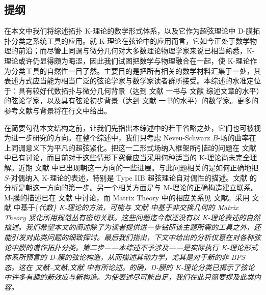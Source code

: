 \documentclass[11pt,a4paper]{ctexart}
\newcommand{\SrcRange}[2]{\marginpar{\raggedright\footnotesize 原文 p.#1}}
\begin{document}
\SrcRange{9}{9}
\subsection{提纲}\label{ux63d0ux7eb2}

在本文中我们将综述拓扑 K-理论的数学形式体系，以及它作为超弦理论中 D-膜拓扑分类之系统工具的应用。就 K-理论在弦论中的应用而言，它如今正处于数学物理的前沿；而尽管上同调与微分几何对大多数理论物理学家来说已相当熟悉，K-理论或许仍显得颇为晦涩，因此我们试图把数学与物理融合在一起，使 K-理论作为分类工具的自然性一目了然。主要目的是把所有相关的数学材料汇集于一处，其表述方式应当能为相当广泛的弦论学家与数学家读者群所接受。本综述的水准定位于：具有较好代数拓扑与微分几何背景（达到 文献 一书与 文献 综述文章的水平）的弦论学家，以及具有弦论初步背景（达到 文献 一书的水平）的数学家。更多的参考文献与背景将在行文中给出。

在简要勾勒本文结构之前，让我们先指出本综述中的若干省略之处，它们也可被视为进一步研究的方向。在整个综述中，我们只考虑 Neveu-Schwarz \(B\)-场的曲率在上同调意义下为平凡的超弦紧化。把这一二形式场纳入框架所引起的问题在 文献 中已有讨论，而目前对于这些情形下究竟应当采用何种适当的 K-理论尚未完全理解。近期 文献 中已出现朝这一方向的一些进展。与此问题相关的是如何正确地把 \(S\)-对偶纳入 K-理论的表述，特别是 Type IIB 超弦理论自对偶性的描述。文献 的分析是朝这一方向的第一步。另一个相关方面是与 M-理论的正确构造建立联系。M-膜的描述已在 文献 中讨论，而 Matrix Theory 中的相应关系见 文献。采用 文献 中基于\{\it 代数\} K-理论的方法，可能与 文献 中基于非交换几何的 Matrix Theory 紧化所用规范丛有密切关联。这些问题迄今都还没有以 K-理论表述的自然描述。我们希望本文的阐述除了为读者提供进一步钻研该主题所需的工具之外，还能引发对此类问题的细致探讨。最后我们指出，下文中给出的分析仅意在对各种弦论中膜的谱作拓扑分类。第二步------本综述不予涉及------是实际执行 K-理论形式体系所预言的 D-膜的弦论构造，从而描述其动力学，尤其是对于新的非 BPS 态。这在 文献--文献,文献 中有所论述。的确，D-膜的 K-理论分类已揭示了弦论中许多有趣的新效应与新构造。为使表述尽可能自足，我们在此只简要提及此类内容。
\end{document}
